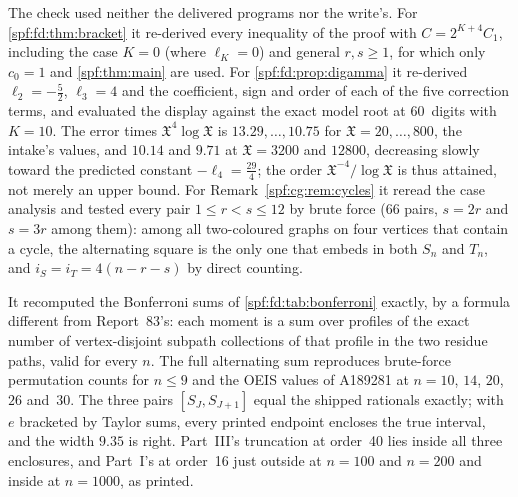 \documentclass[11pt]{article}
\numberwithin{equation}{section}
\theoremstyle{definition}
\theoremstyle{remark}
\theoremstyle{definition}
\begin{document}
The check used neither the delivered programs nor the write's. For
\cref{spf:fd:thm:bracket} it re-derived every inequality of the proof with
$C=2^{K+4}C_1$, including the case $K=0$ (where $\ell_K=0$) and general
$r,s\ge1$, for which only $c_0=1$ and \cref{spf:thm:main} are used. For
\cref{spf:fd:prop:digamma} it re-derived $\ell_2=-\frac52$, $\ell_3=4$ and
the coefficient, sign and order of each of the five correction terms, and
evaluated the display against the exact model root at 60~digits with
$K=10$. The error times $\mathfrak X^4\log\mathfrak X$ is
$13.29,\ldots,10.75$ for $\mathfrak X=20,\ldots,800$, the intake's values,
and $10.14$ and $9.71$ at $\mathfrak X=3200$ and $12800$, decreasing slowly
toward the predicted constant $-\ell_4=\frac{29}4$; the order
$\mathfrak X^{-4}/\log\mathfrak X$ is thus attained, not merely an upper
bound. For Remark~\ref{spf:cg:rem:cycles} it reread the case analysis and
tested every pair $1\le r<s\le12$ by brute force (66 pairs, $s=2r$ and
$s=3r$ among them): among all two-coloured graphs on four vertices that
contain a cycle, the alternating square is the only one that embeds in both
$S_n$ and $T_n$, and $i_S=i_T=4(n-r-s)$ by direct counting.

It recomputed the Bonferroni sums of \cref{spf:fd:tab:bonferroni} exactly,
by a formula different from Report~83's: each moment is a sum over
profiles of the exact number of vertex-disjoint subpath collections of
that profile in the two residue paths, valid for every $n$. The full
alternating sum reproduces brute-force permutation counts for $n\le9$ and
the OEIS values of A189281 at $n=10$, $14$, $20$, $26$ and~$30$. The three
pairs $[S_J,S_{J+1}]$ equal the shipped rationals exactly; with $e$
bracketed by Taylor sums, every printed endpoint encloses the true
interval, and the width $9.35$ is right. Part~III's truncation at order~40
lies inside all three enclosures, and Part~I's at order~16 just outside at
$n=100$ and $n=200$ and inside at $n=1000$, as printed.
\end{document}
